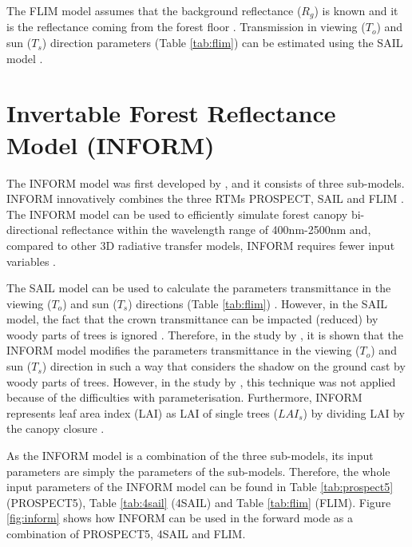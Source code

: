 \documentclass[a4paper, twoside]{templates/ociamthesis}
\begin{document}
The FLIM model assumes that the background reflectance (\(R_{g}\)) is known \citep{rosema1992new} and it is the reflectance coming from the forest floor \citep{atzberger2000development}. Transmission in viewing (\(T_{o}\)) and sun (\(T_{s}\)) direction parameters (Table \ref{tab:flim}) can be estimated using the SAIL model \citep{atzberger2000development, schlerf2006inversion}.

\hypertarget{inform}{%
\section{Invertable Forest Reflectance Model (INFORM)}\label{inform}}

The INFORM model was first developed by \citet{atzberger2000development}, and it consists of three sub-models. INFORM innovatively combines the three RTMs PROSPECT, SAIL and FLIM \citep{atzberger2000development, schlerf2006inversion}. The INFORM model can be used to efficiently simulate forest canopy bi-directional reflectance within the wavelength range of 400nm-2500nm \citep{schlerf2006inversion} and, compared to other 3D radiative transfer models, INFORM requires fewer input variables \citep{atzberger2000development, ali2020machine}.

The SAIL model can be used to calculate the parameters transmittance in the viewing (\(T_{o}\)) and sun (\(T_{s}\)) directions (Table \ref{tab:flim}) \citep{verhoef1984light}. However, in the SAIL model, the fact that the crown transmittance can be impacted (reduced) by woody parts of trees is ignored \citep{atzberger2000development}. Therefore, in the study by \citet{atzberger2000development}, it is shown that the INFORM model modifies the parameters transmittance in the viewing (\(T_{o}\)) and sun (\(T_{s}\)) direction in such a way that considers the shadow on the ground cast by woody parts of trees. However, in the study by \citet{schlerf2006inversion}, this technique was not applied because of the difficulties with parameterisation. Furthermore, INFORM represents leaf area index (LAI) as LAI of single trees (\(LAI_{s}\)) by dividing LAI by the canopy closure \citep{ali2016retrieval, ali2020machine}.

As the INFORM model is a combination of the three sub-models, its input parameters are simply the parameters of the sub-models. Therefore, the whole input parameters of the INFORM model can be found in Table \ref{tab:prospect5} (PROSPECT5), Table \ref{tab:4sail} (4SAIL) and Table \ref{tab:flim} (FLIM). Figure \ref{fig:inform} shows how INFORM can be used in the forward mode as a combination of PROSPECT5, 4SAIL and FLIM.
\end{document}

